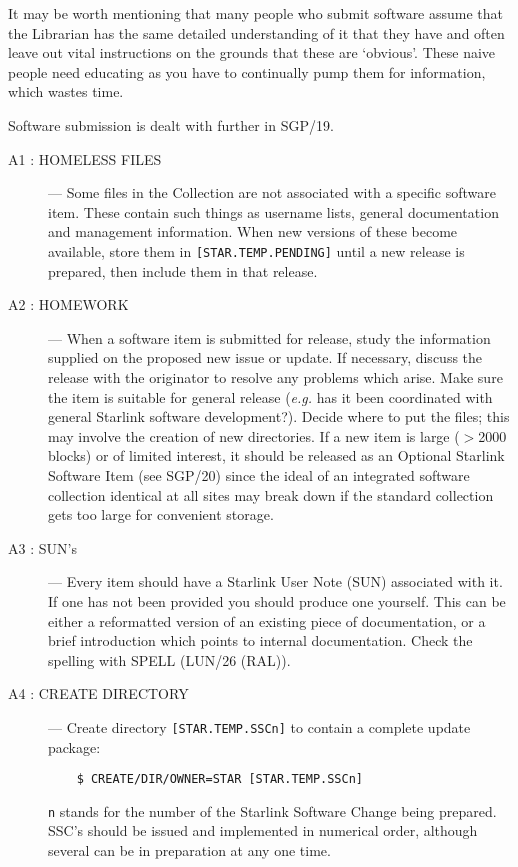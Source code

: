 It may be worth mentioning that many people who submit software assume that the
Librarian has the same detailed understanding of it that they have and often
leave out vital instructions on the grounds that these are `obvious'.
These naive people need educating as you have to continually pump them for
information, which wastes time.

Software submission is dealt with further in SGP/19.

\begin{description}

\item [A1 : HOMELESS FILES] ---
Some files in the Collection are not associated with a specific software item.
These contain such things as username lists, general documentation and 
management information.
When new versions of these become available, store them in 
{\tt [STAR.TEMP.PENDING]} until a new release is prepared, then include them 
in that release.

\item [A2 : HOMEWORK] ---
When a software item is submitted for release, study the information supplied
on the proposed new issue or update.
If necessary, discuss the release with the originator to resolve any problems
which arise.
Make sure the item is suitable for general release ({\em e.g.} has it been
coordinated with general Starlink software development?).
Decide where to put the files; this may involve the creation of new directories.
If a new item is large ($>$2000 blocks) or of limited interest, it should be
released as an Optional Starlink Software Item (see SGP/20) since the ideal
of an integrated software collection identical at all sites may break down if
the standard collection gets too large for convenient storage.

\item [A3 : SUN's] ---
Every item should have a Starlink User Note (SUN) associated with it.
If one has not been provided you should produce one yourself.
This can be either a reformatted version of an existing piece of documentation,
or a brief introduction which points to internal documentation.
Check the spelling with SPELL (LUN/26 (RAL)).

\item [A4 : CREATE DIRECTORY] ---
Create directory {\tt [STAR.TEMP.SSCn]} to contain a complete update package:
\begin{verbatim}
    $ CREATE/DIR/OWNER=STAR [STAR.TEMP.SSCn]
\end{verbatim}
{\tt n} stands for the number of the Starlink Software Change being prepared.
SSC's should be issued and implemented in numerical order, although several
can be in preparation at any one time.


\end{description}
